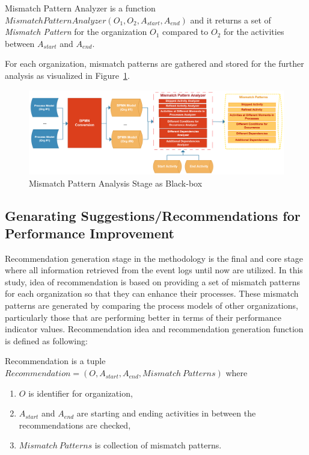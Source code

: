 \begin{definition}
    Mismatch Pattern Analyzer is a function $MismatchPatternAnalyzer(O_{1}, O_{2}, A_{start}, A_{end})$ and it returns a set of \textit{Mismatch Pattern} for the organization $O_{1}$ compared to $O_{2}$ for the activities between $A_{start}$ and $A_{end}$.
\end{definition}

For each organization, mismatch patterns are gathered and stored for the further analysis as visualized in Figure~\ref{fig:mismatch-pattern-analysis-blackbox}.
\begin{figure}
  \centering
  \includegraphics[width=\textwidth]{4_methodology/mismatch-pattern-analysis-blackbox}
  \caption{Mismatch Pattern Analysis Stage as Black-box}
  \label{fig:mismatch-pattern-analysis-blackbox}
\end{figure}

\subsection{Genarating Suggestions/Recommendations for Performance Improvement}
\label{subsec:recommendation-generation}
\theoremstyle{definition}
Recommendation generation stage in the methodology is the final and core stage where all information retrieved from the event logs until now are utilized. In this study, idea of recommendation is based on providing a set of mismatch patterns for each organization so that they can enhance their processes. These mismatch patterns are generated by comparing the process models of other organizations, particularly those that are performing better in terms of their performance indicator values. Recommendation idea and recommendation generation function is defined as following:
\begin{definition}
Recommendation is a tuple ${Recommendation} = (O, A_{start}, A_{end}, Mismatch\ Patterns) $ where 
  \begin{enumerate}
    \item $O$ is identifier for organization,
    \item $A_{start}$ and $A_{end}$ are starting and ending activities in between the recommendations are checked,
    \item $Mismatch\ Patterns$ is collection of mismatch patterns.
  \end{enumerate}
\end{definition}

